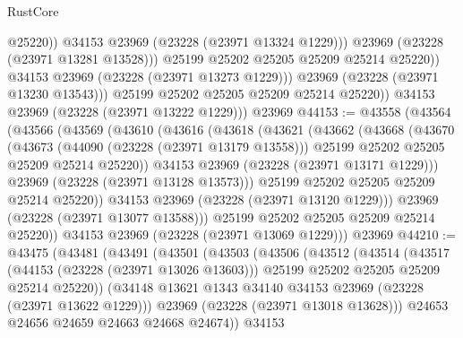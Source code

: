 \begin{lexlean}{RustCore}
\begin{coremodule}
                          @25220))
                      @34153
                      @23969
                      (@23228 (@23971 @13324 @1229)))
                    @23969
                    (@23228 (@23971 @13281 @13528)))
                  @25199
                  @25202
                  @25205
                  @25209
                  @25214
                  @25220))
              @34153
              @23969
              (@23228 (@23971 @13273 @1229)))
            @23969
            (@23228 (@23971 @13230 @13543)))
          @25199
          @25202
          @25205
          @25209
          @25214
          @25220))
      @34153
      @23969
      (@23228 (@23971 @13222 @1229)))
    @23969
@44153 := @43558
    (@43564
      (@43566
        (@43569
          (@43610
            (@43616
              (@43618
                (@43621
                  (@43662
                    (@43668
                      (@43670
                        (@43673
                          (@44090 (@23228 (@23971 @13179 @13558)))
                          @25199
                          @25202
                          @25205
                          @25209
                          @25214
                          @25220))
                      @34153
                      @23969
                      (@23228 (@23971 @13171 @1229)))
                    @23969
                    (@23228 (@23971 @13128 @13573)))
                  @25199
                  @25202
                  @25205
                  @25209
                  @25214
                  @25220))
              @34153
              @23969
              (@23228 (@23971 @13120 @1229)))
            @23969
            (@23228 (@23971 @13077 @13588)))
          @25199
          @25202
          @25205
          @25209
          @25214
          @25220))
      @34153
      @23969
      (@23228 (@23971 @13069 @1229)))
    @23969
@44210 := @43475
    (@43481
      (@43491
        (@43501
          (@43503
            (@43506
              (@43512
                (@43514
                  (@43517
                    (@44153 (@23228 (@23971 @13026 @13603)))
                    @25199
                    @25202
                    @25205
                    @25209
                    @25214
                    @25220))
                (@34148 @13621 @1343 @34140 @34153 @23969 (@23228 (@23971 @13622 @1229)))
                @23969
                (@23228 (@23971 @13018 @13628)))
              @24653
              @24656
              @24659
              @24663
              @24668
              @24674))
          @34153

\end{coremodule}
\end{lexlean}
